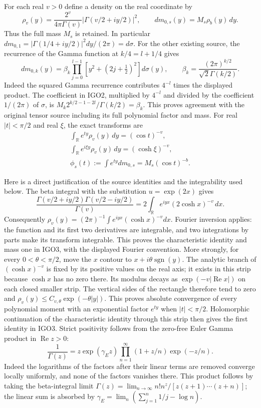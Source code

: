 \documentclass[11pt,a4paper]{article}
\begin{document}
For each real $v>0$ define a density on the real coordinate by
\[
 \rho_v(y)=\frac{2^v}{4\pi\Gamma(v)}
       \left|\Gamma(v/2+iy/2)\right|^2,
 \qquad dm_{0,s}(y)=M_s\rho_b(y)\,dy.
 \tag{IGO2}
\]
Thus the full mass $M_s$ is retained. In particular
$dm_{0,1}=|\Gamma(1/4+iy/2)|^2dy/(2\pi)=d\sigma$.
For the other existing source, the recurrence of the Gamma function
at $k/4=l+1/4$ gives
\[
 dm_{0,k}(y)=\beta_k\prod_{j=0}^{l-1}
           [y^2+(2j+\tfrac12)^2]d\sigma(y),\qquad
 \beta_k=\frac{(2\pi)^{k/2}}{\sqrt2\Gamma(k/2)}.
\]
Indeed the squared Gamma recurrence contributes $4^{-l}$ times
the displayed product. The coefficient in IGO2, multiplied by
$4^{-l}$ and divided by the coefficient $1/(2\pi)$ of $\sigma$,
is $M_k2^{k/2-1-2l}/\Gamma(k/2)=\beta_k$.
This proves agreement with the original tensor source including
its full polynomial factor and mass.
For real $|t|<\pi/2$ and real $\xi$, the exact transforms are
\[
 \begin{gathered}
 \int_{\mathbb R}e^{ty}\rho_v(y)\,dy=(\cos t)^{-v},\\
 \int_{\mathbb R}e^{i\xi y}\rho_v(y)\,dy=(\cosh\xi)^{-v},
 \\ \phi_s(t):=\int e^{ty}dm_{0,s}=M_s(\cos t)^{-b}.
 \end{gathered}
 \tag{IGO3}
\]

Here is a direct justification of the source identities and the
integrability used below. The beta integral with the substitution
$u=\exp(2x)$ gives
\[
 \frac{\Gamma(v/2+iy/2)\Gamma(v/2-iy/2)}{\Gamma(v)}
  =2\int_{\mathbb R} e^{iyx}(2\cosh x)^{-v}\,dx.
\]
Consequently $\rho_v(y)=(2\pi)^{-1}
\int e^{iyx}(\cosh x)^{-v}dx$. Fourier inversion applies: the
function and its first two derivatives are integrable, and two
integrations by parts make its transform integrable. This proves
the characteristic identity and mass one in IGO3, with the displayed
Fourier convention. More strongly, for every $0<\theta<\pi/2$, move
the $x$ contour to $x+i\theta\operatorname{sgn}(y)$. The analytic
branch of $(\cosh x)^{-v}$ is fixed by its positive values on the
real axis; it exists in this strip because $\cosh x$ has no zero
there. Its modulus decays as $\exp(-v|\operatorname{Re}x|)$ on
each closed smaller strip. The vertical sides of the rectangle
therefore tend to zero and
$\rho_v(y)\leq C_{v,\theta}\exp(-\theta|y|)$.
This proves absolute convergence of every polynomial moment with
an exponential factor $e^{ty}$ when $|t|<\pi/2$. Holomorphic
continuation of the characteristic identity through this strip
then gives the first identity in IGO3. Strict positivity follows
from the zero-free Euler Gamma product in $\operatorname{Re}z>0$:
\[
 \frac1{\Gamma(z)}=z\exp(\gamma_{\!E}z)
       \prod_{n=1}^{\infty}(1+z/n)\exp(-z/n).
\]
Indeed the logarithms of the factors after their linear terms are
removed converge locally uniformly, and none of the factors vanishes
there. This product follows by taking the beta-integral limit
$\Gamma(z)=\lim_{n\to\infty}n!n^z/[z(z+1)\cdots(z+n)]$;
the linear sum is absorbed by
$\gamma_{\!E}=\lim_n(\sum_{j=1}^n1/j-\log n)$.
\end{document}

